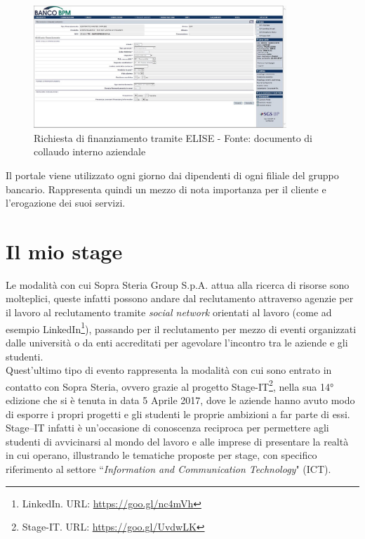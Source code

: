 	\begin{figure}[H]
		\centering
	   	\includegraphics[width=0.85\textwidth]{immagini/RichiestaFinanziamento}
	   	\caption{Richiesta di finanziamento tramite ELISE - Fonte: documento di collaudo interno aziendale}
	\end{figure}
	
	Il portale viene utilizzato ogni giorno dai dipendenti di ogni filiale del gruppo bancario. Rappresenta quindi un mezzo di nota importanza per il cliente	e l'erogazione dei suoi servizi.

		
\section{Il mio stage}

Le modalità con cui Sopra Steria Group S.p.A. attua alla ricerca di risorse sono molteplici, queste infatti possono andare dal reclutamento attraverso agenzie per il lavoro al reclutamento tramite \textit{social network} orientati al lavoro (come ad esempio LinkedIn\footnote{LinkedIn. URL: \url{https://goo.gl/nc4mVh}}), passando per il reclutamento per mezzo di eventi organizzati dalle università o da enti accreditati per agevolare l'incontro tra le aziende e gli studenti.\\

Quest'ultimo tipo di evento rappresenta la modalità con cui sono entrato in contatto con Sopra Steria, ovvero grazie al progetto Stage-IT\footnote{Stage-IT. URL: \url{https://goo.gl/UvdwLK}}, nella sua \ang{14} edizione che si è tenuta in data 5 Aprile 2017, dove le aziende hanno avuto modo di esporre i propri progetti e gli studenti le proprie ambizioni a far parte di essi. Stage–IT infatti è un'occasione di conoscenza reciproca per permettere agli studenti di avvicinarsi al mondo del lavoro e alle imprese di presentare la realtà in cui operano, illustrando le tematiche proposte per stage, con specifico riferimento al settore “\textit{Information and Communication Technology}" (ICT).

